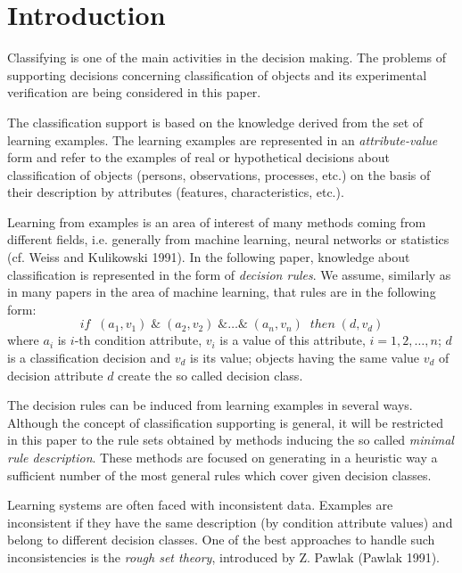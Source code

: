 \section{Introduction}

Classifying is one of the main activities  in  the  decision  making.
The problems of supporting decisions  concerning   classification  of
objects and its experimental verification  are  being  considered  in
this paper.

The classification support is based on the  knowledge   derived  from
the set   of    learning    examples.    The    learning     examples
are represented in an {\it attribute-value} form and   refer  to  the
examples    of   real   or     hypothetical      decisions      about
classification    of   objects  (persons,  observations,   processes,
etc.)  on    the    basis   of   their  description   by   attributes
(features,  characteristics, etc.).

Learning from examples is an  area  of  interest  of  many  methods
coming from different fields, i.e. generally from machine learning,
neural networks or statistics (cf. Weiss and Kulikowski 1991).
In the  following paper, knowledge about classification is
represented in the form of
{\it decision rules}. We assume, similarly as in many papers in the
area of machine learning, that rules are in the following form:
\begin{displaymath}
     if \; \; (a_{1},v_{1}) \; \& \; (a_{2},v_{2}) \;\& \ldots  \&
     \; (a_{n},v_{n}) \; \; then \; (d,v_{d})
\end{displaymath}
where $a_{i}$ is $i$-th condition attribute, $v_{i}$ is a value  of
this attribute, $i=1,2, \ldots ,  n$;  $d$  is  a  classification
decision and $v_{d}$ is its value; objects having  the  same  value
$v_{d}$ of decision  attribute  $d$  create the so called  decision
class.

The decision rules can be induced from learning examples in several
ways. Although the concept of classification supporting  is general,
 it  will  be  restricted in this paper to the rule sets
obtained by methods inducing the so called {\it minimal rule description}.
These methods are focused on generating in a heuristic way a
sufficient number of the most general rules which cover given decision
classes.

Learning  systems  are  often  faced  with  inconsistent data.
 Examples  are  inconsistent  if they have the same description (by
condition attribute values)  and belong to different decision
classes. One of  the  best  approaches  to handle such
inconsistencies is the  {\it  rough  set  theory},
introduced by Z.  Pawlak  (Pawlak 1991).

